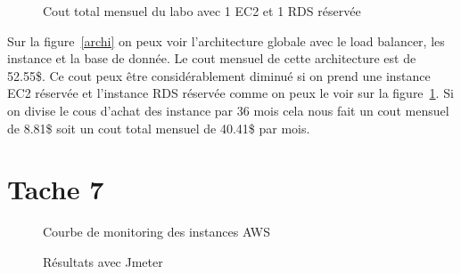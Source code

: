 \documentclass[french,a4paper,11pt]{article}
\begin{document}
    \begin{figure}
        \caption{\label{total-cost-reserved}Cout total mensuel du labo avec 1 EC2 et 1 RDS réservée}
    \end{figure}

    Sur la figure~\ref{archi} on peux voir l'architecture globale avec le load balancer, les instance et la base de donnée.
    Le cout mensuel de cette architecture est de 52.55\$.
    Ce cout peux être considérablement diminué si on prend une instance EC2 réservée et l'instance RDS réservée comme on peux le voir sur la figure~\ref{total-cost-reserved}.
    Si on divise le cous d'achat des instance par 36 mois cela nous fait un cout mensuel de 8.81\$ soit un cout total mensuel de 40.41\$ par mois.

    \section{Tache 7}\label{sec:task-7}

    \begin{figure}
        \caption{\label{lb-monit}Courbe de monitoring des instances AWS}
    \end{figure}

    \begin{figure}
        \caption{\label{jmeter}Résultats avec Jmeter}
    \end{figure}
\end{document}
